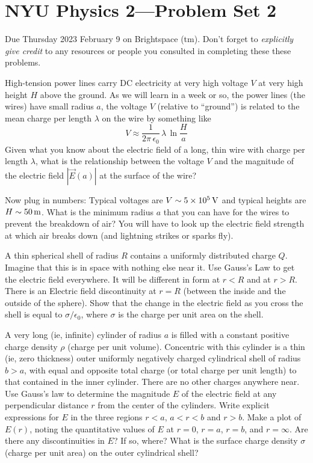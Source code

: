 \documentclass[12pt]{article}
\begin{document}
\section*{NYU Physics 2---Problem Set 2}

Due Thursday 2023 February 9 on Brightspace (tm).
Don't forget to \emph{explicitly give credit} to any resources or people
you consulted in completing these these problems.

\startproblem%
High-tension power lines carry DC electricity at very high voltage $V$ at
very high height $H$ above the ground.
As we will learn in a week or so,
the power lines (the wires) have small radius $a$, the voltage $V$
(relative to ``ground'') is related
to the mean charge per length $\lambda$ on the wire
by something like
\begin{equation}
  V \approx \frac{1}{2\pi\,\epsilon_0}\,\lambda\,\ln\frac{H}{a}
\end{equation}
Given what you know about the electric field of a long, thin wire with
charge per length $\lambda$,
what is the relationship between the voltage $V$ and the magnitude of the electric
field $|\vec{E}(a)|$ at the surface of the wire?

Now plug in numbers:
Typical voltages are $V\sim 5\times 10^5\,\mathrm{V}$ and typical heights are
$H\sim 50\,\mathrm{m}$.
What is the minimum radius $a$ that you can have for the wires to prevent
the breakdown of air?
You will have to look up the electric field strength at which air breaks
down (and lightning strikes or sparks fly).

\startproblem%
A thin spherical shell of radius $R$ contains a uniformly distributed
charge $Q$.  Imagine that this is in space with nothing else near
it. Use Gauss's Law to get the electric field everywhere. It will be
different in form at $r<R$ and at $r>R$. There is an Electric field
discontinuity at $r=R$ (between the inside and the outside of the sphere). Show
that the change in the electric field as you cross the shell is equal
to $\sigma/\epsilon_0$, where $\sigma$ is the charge per unit area on
the shell.

\startproblem%
A very long (ie, infinite) cylinder of radius $a$ is filled with a
constant positive charge density $\rho$ (charge per unit volume).
Concentric with this cylinder is a thin (ie, zero thickness) outer
uniformly negatively charged cylindrical shell of radius $b>a$, with
equal and opposite total charge (or total charge per unit length) to that
contained in the inner cylinder.  There are no other charges anywhere near.  Use
Gauss's law to determine the magnitude $E$ of the electric field at
any perpendicular distance $r$ from the center of the cylinders.
Write explicit expressions for $E$ in the three regions $r<a$, $a<r<b$
and $r>b$.  Make a plot of $E(r)$, noting the quantitative values of
$E$ at $r=0$, $r=a$, $r=b$, and $r=\infty$.  Are there any
discontinuities in $E$?  If so, where?  What is the surface charge
density $\sigma$ (charge per unit area) on the outer cylindrical
shell?
\end{document}
